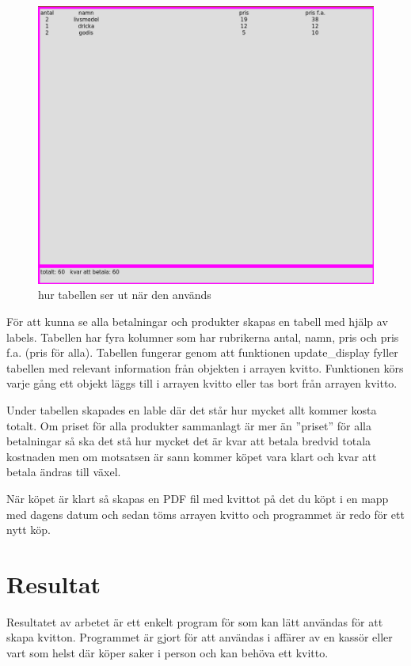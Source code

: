 \documentclass[a4paper, 12pt]{article}
\begin{document}
\begin{figure}[t!]
\centering
  \includegraphics[width=0.7\linewidth]{img/kvitto_disp.png}
  \caption{ hur tabellen ser ut när den används}
  \label{fig:kdisp}
\end{figure}

För att kunna se alla betalningar och produkter skapas en tabell med hjälp av labels. Tabellen har fyra kolumner som har rubrikerna antal, namn, pris och pris f.a. (pris för alla).
Tabellen fungerar genom att funktionen update\_display fyller tabellen med relevant information från objekten i arrayen kvitto. Funktionen körs varje gång ett objekt läggs till i arrayen kvitto eller tas bort från arrayen kvitto.


Under tabellen skapades en lable där det står hur mycket allt kommer kosta totalt. Om priset för alla produkter sammanlagt är mer än ''priset'' för alla betalningar så ska det stå hur mycket det är kvar att betala bredvid totala kostnaden men om motsatsen är sann kommer köpet vara klart och kvar att betala ändras till växel. 


När köpet är klart så skapas en PDF fil med kvittot på det du köpt i en mapp med dagens datum och sedan töms arrayen kvitto och programmet är redo för ett nytt köp.


\section{Resultat}

Resultatet av arbetet är ett enkelt program för som kan lätt användas för att skapa kvitton.
Programmet är gjort för att användas i affärer av en kassör eller vart som helst där köper saker i person och kan behöva ett kvitto.
\end{document}
